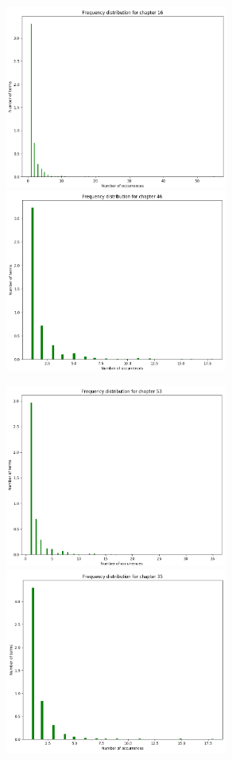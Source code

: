 \documentclass{article}
\begin{document}
\begin{flushleft}
\begin{figure}[H]
\begin{minipage}{0.42\linewidth}
\includegraphics[width=0.65\textwidth]{./images/4-chapter_wise-frequency.png}
\includegraphics[width=0.65\textwidth]{./images/5-chapter_wise-frequency.png}
\end{minipage}
\hfill
\begin{minipage}{0.42\linewidth}
\centering
\includegraphics[width=0.65\textwidth]{./images/6-chapter_wise-frequency.png}
\includegraphics[width=0.65\textwidth]{./images/7-chapter_wise-frequency.png}

\end{minipage}
\end{figure}
\end{flushleft}
\end{document}
